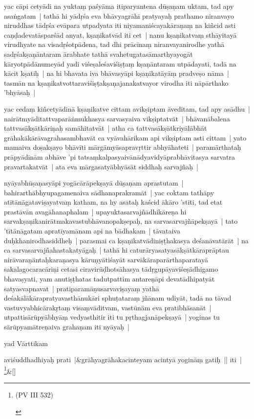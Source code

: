 \documentclass[article,12pt,a4paper]{memoir}
\begin{document}
	  \pstart yac cāpi cetyādi na yuktaṃ paśyāma itiparyantena dūṣaṇam uktam, tad apy asaṅgatam | tathā hi yādṛśa eva bhāvyagrāhī pratyayaḥ prathamo niranvayo niruddhas tādṛśa evāpara utpadyata iti niyamaniścayakāraṇaṃ na kiñcid asti caṇḍadevatāsparśād anyat, kṣaṇikatvād iti cet | nanu kṣaṇikatvaṃ sthāyitayā virudhyate na visadṛśotpādena, tad dhi prācīnaṃ niranvayanirodhe yathā sadṛśakṣaṇāntaram ārabhate tathā svahetugatasāmarthyayogāt kāryotpādānumeyād yadi viśeṣaleśaviśiṣṭaṃ kṣaṇāntaram utpādayati, tadā na kācit kṣatiḥ | na hi bhavata iva bhāvasyāpi kṣaṇikatāyāṃ pradveṣo nāma | tasmān na kṣaṇikatvottaraviśiṣṭakṣaṇajanakatvayor virodha iti nāpārthako 'bhyāsaḥ | 
	\pend
      

	  \pstart yac cedaṃ kiñcetyādinā kṣaṇikatve cittam avikṣiptam āveditam, tad apy asādhu | nairātmyāditattvaparāṅmukhasya sarvasyaiva vikṣiptatvāt | bhāvanābalena tattvasākṣātkāriṇaḥ samāhitatvāt | atha ca tattvasākṣātkriyālābhāt grāhakākārāvagrahasambhavāt ca vyāvahārikam api vikṣiptam asti cittam | yato mamaiva doṣakṣayo bhāvīti mārgāmyāsapravṛttir abhyāhateti | paramārthataḥ prāpyādīnām abhāve 'pi tatsaṃkalpasyaivānādyavidyāprabhāvitasya sarvatra pravartakatvāt | ata eva mārgasatyābhyāsāt siddhaḥ sarvajñaḥ | 
	\pend
      

	  \pstart nyāyabhūṣaṇasyāpi yogācārāpekṣayā dūṣaṇam aprastutam | bahirarthābhyupagamenaiva sādhanaprakramāt | yac coktam tathāpy atītānāgataviṣayatvaṃ katham, na hy asataḥ kaścid ākāro 'stīti, tad etat prastāvān avagāhanaphalam | upayuktasarvajñādhikāreṇa hi sarvakṣaṇikanirātmakavastubhāvanopakṣepaḥ, na sarvasarvajñāpekṣayā | tato 'tītānāgatam apratīyamānam api na bādhakam | tāvataiva duḥkhanirodhasiddheḥ | parasmai ca kṣaṇikatvādiniṣṭhakasya deśanāvatārāt | na ca sarvasarvajñahastakatyāgaḥ | tathā hi caturāryasatyasākṣātkāraprāptau nirāvaraṇāntaḥkaraṇasya kāruṇyātiśayāt sarvākāraparārthaparatayā sakalagocaracāriṇi cetasi ciravirūḍhotsāhasya tādṛgupāyaviśeṣādhigamo bhavaṣyati, yam anutiṣṭhatas tadutpattim antareṇāpi devatādhipatyāt satyasvapnavat | pratiparamāṇusarvaviṣayaṃ yathā deśakālākārapratyavasthānukāri sphuṭataraṃ jñānam udiyāt, tadā na tāvad vastuvyabhicārakṛtaṃ visaṃvāditvam, vastūnām eva pratibhāsanāt | utpattisārūpyābhyāṃ vedyasthitir iti tu pṛthagjanāpekṣayā | yoginas tu sārūpyamātreṇaiva grahaṇam iti nyāyaḥ | 
	\pend
      

	  \pstart yad Vārttikam 
	\pend
      
	    
	    \stanza[\smallbreak]
	aviśuddhadhiyaḥ prati |&grāhyagrāhakacinteyam acintyā yogināṃ gatiḥ || iti | \footnote{\begin{english}(PV III 532)\end{english}}\&[\smallbreak]
\end{document}
